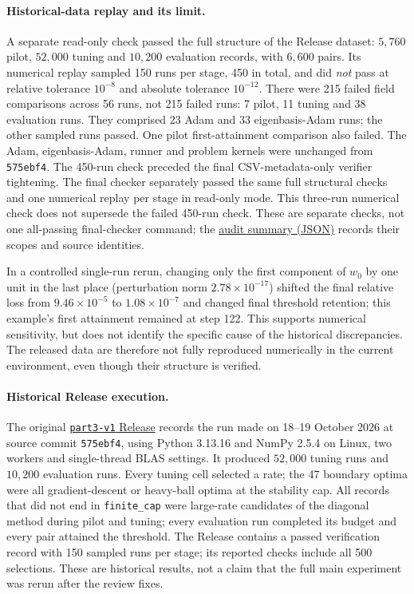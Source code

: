 \documentclass[11pt,a4paper]{article}
\newcommand{\code}[1]{\texttt{#1}}
\begin{document}
\paragraph{Historical-data replay and its limit.} A separate read-only
check passed the full structure of the Release dataset: $5{,}760$ pilot,
$52{,}000$ tuning and $10{,}200$ evaluation records, with $6{,}600$ pairs.
Its numerical replay sampled 150 runs per stage, 450 in total, and did
\emph{not} pass at relative tolerance $10^{-8}$ and absolute tolerance
$10^{-12}$. There were 215 failed field comparisons across 56 runs, not
215 failed runs: 7 pilot, 11 tuning and 38 evaluation runs. They comprised
23 Adam and 33 eigenbasis-Adam runs; the other sampled runs passed. One pilot
first-attainment comparison also failed. The Adam,
eigenbasis-Adam, runner and problem kernels were unchanged from \code{575ebf4}.
The 450-run check preceded the final CSV-metadata-only verifier tightening.
The final checker separately passed the same full structural checks and one
numerical replay per stage in read-only mode. This three-run numerical check
does not supersede the failed 450-run check. These are separate checks, not
one all-passing final-checker command; the
\href{https://github.com/kvvvvvv23/aisc5020-coordinate-geometry/blob/main/docs/part3_validation_2026-10-19.json}{audit summary (JSON)}
records their scopes and source identities.

In a controlled single-run rerun, changing only the first component of $w_0$
by one unit in the last place (perturbation norm $2.78\times10^{-17}$) shifted
the final relative loss from $9.46\times10^{-5}$ to $1.08\times10^{-7}$ and
changed final threshold retention; this example's first attainment remained
at step 122. This supports numerical sensitivity, but
does not identify the specific cause of the historical discrepancies. The
released data are therefore not fully reproduced numerically in the current
environment, even though their structure is verified.

\paragraph{Historical Release execution.} The original
\href{https://github.com/akaComic/aisc5020-coordinate-geometry/releases/tag/part3-v1}{\code{part3-v1} Release}
records the run made on 18--19 October 2026 at source commit
\code{575ebf4}, using Python 3.13.16 and NumPy 2.5.4 on Linux, two workers
and single-thread BLAS settings. It produced
$52{,}000$ tuning runs and $10{,}200$ evaluation runs. Every tuning cell
selected a rate; the 47 boundary optima were all gradient-descent or heavy-ball
optima at the stability cap. All records that did not end in
\code{finite\_cap} were large-rate candidates of the diagonal method during
pilot and tuning; every evaluation run completed its budget and every pair
attained the threshold. The Release contains a passed verification record with
150 sampled runs per stage; its reported checks include all 500 selections.
These are historical results, not a claim that the full main experiment was
rerun after the review fixes.
\end{document}
